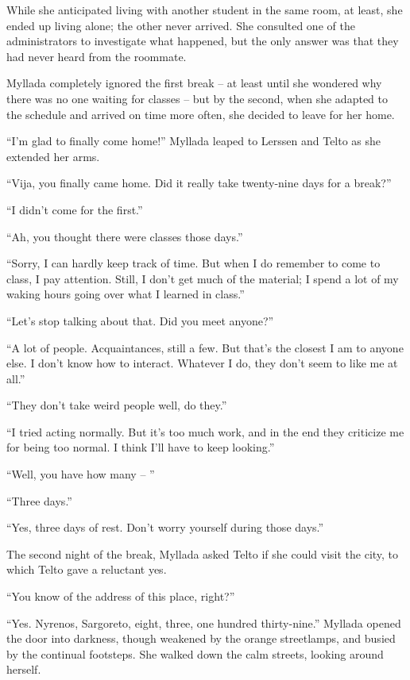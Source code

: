 While she anticipated living with another student in the same room, at least, she ended up living alone; the other never arrived. She consulted one of the administrators to investigate what happened, but the only answer was that they had never heard from the roommate.

Myllada completely ignored the first break -- at least until she wondered why there was no one waiting for classes -- but by the second, when she adapted to the schedule and arrived on time more often, she decided to leave for her home.

\centeredstars

``I'm glad to finally come home!'' Myllada leaped to Lerssen and Telto as she extended her arms.

``Vija, you finally came home. Did it really take twenty-nine days for a break?''

``I didn't come for the first.''

``Ah, you thought there were classes those days.''

``Sorry, I can hardly keep track of time. But when I do remember to come to class, I pay attention. Still, I don't get much of the material; I spend a lot of my waking hours going over what I learned in class.''

``Let's stop talking about that. Did you meet anyone?''

``A lot of people. Acquaintances, still a few. But that's the closest I am to anyone else. I don't know how to interact. Whatever I do, they don't seem to like me at all.''

``They don't take weird people well, do they.''

``I tried acting normally. But it's too much work, and in the end they criticize me for being too normal. I think I'll have to keep looking.''

``Well, you have how many -- ''

``Three days.''

``Yes, three days of rest. Don't worry yourself during those days.''

\centeredstars

The second night of the break, Myllada asked Telto if she could visit the city, to which Telto gave a reluctant yes.

``You know of the address of this place, right?''

``Yes. Nyrenos, Sargoreto, eight, three, one hundred thirty-nine.'' Myllada opened the door into darkness, though weakened by the orange streetlamps, and busied by the continual footsteps. She walked down the calm streets, looking around herself.


